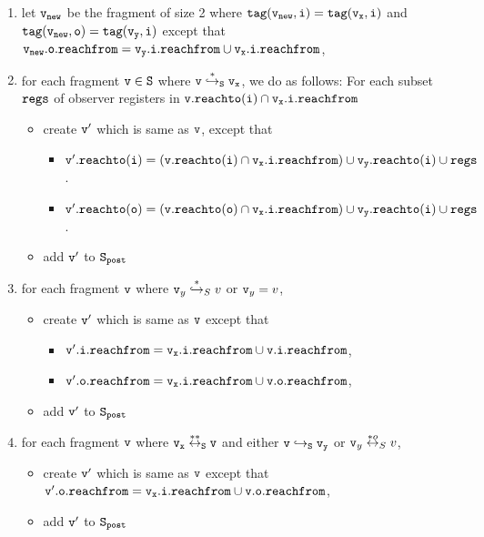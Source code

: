 \begin{description}
\begin{enumerate}
\item let $\tt v_{new}$ be the fragment of size 2 where $\tt tag(v_{new},i) = tag(v_x, i)$ and $\tt tag(v_{new},o) = tag(\mathtt{v}_y,i)$ except that $\tt v_{new}.o.reachfrom = \mathtt{v}_y.i.reachfrom \cup v_x.i.reachfrom$,
\item  for each fragment $\tt v \in S$ where $\tt v \overset{*}\hookrightarrow_S v_x$, we do as follows: For each subset $\tt regs$ of observer registers in $\tt v.reachto(\tt i) \cap \tt v_x.i.reachfrom$
\begin{itemize}
\item create $\tt v'$ which is same as $\tt v$, except that
\begin{itemize}
\item $\tt v'.reachto(\tt i) = (\tt v.reachto(\tt i) \cap v_x.i.reachfrom) \cup \mathtt{v}_y.reachto(\tt i) \cup regs$.
\item $\tt v'.reachto(\tt o) = (\tt v.reachto(\tt o) \cap v_x.i.reachfrom) \cup \mathtt{v}_y.reachto(\tt i) \cup regs$.
\end{itemize}
\item add $\tt v'$ to $\tt S_{post}$
\end{itemize}

\item for each fragment $\tt v$ where $\mathtt{v}_y \overset{*}\hookrightarrow_S v$ or $\mathtt{v}_y = v$,
   
\begin{itemize}
	\item create  $\tt v'$ which is same as $\tt v$ except that
\begin{itemize}
 \item $\tt \mathtt{v}'.\mathtt{i}.\mathtt{reachfrom} = v_x.i.reachfrom \cup \tt \mathtt{v}.\mathtt{i}.\mathtt{reachfrom}$, 
\item $\tt \mathtt{v}'.\mathtt{o}.\mathtt{reachfrom} = v_x.i.reachfrom \cup \tt \mathtt{v}.\mathtt{o}.\mathtt{reachfrom}$, 
\end{itemize}
\item add $\tt v'$ to $\tt S_{post}$
\end{itemize}
\item for each fragment $\tt v$ where $\tt v_x \overset{**}\leftrightarrow_S v$ and either $\tt v \hookrightarrow_S \mathtt{v}_y$ or $\mathtt{v}_y \overset{*o}\leftrightarrow_S v$, 
\begin{itemize}
\item  create $\tt v'$ which is same as $\tt v$ except that $\tt \mathtt{v}'.\mathtt{o}.\mathtt{reachfrom} = v_x.i.reachfrom \cup \tt \mathtt{v}.\mathtt{o}.\mathtt{reachfrom}$, 
 \item add $\tt v'$ to $\tt S_{post}$ 
\end{itemize}



\end{enumerate}
\end{description}
